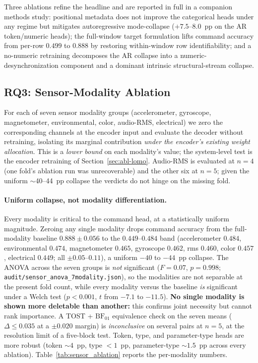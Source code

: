 \documentclass[sensors,article,submit,moreauthors,pdftex]{Definitions/mdpi}
\begin{document}
Three ablations refine the headline and are reported in full in a companion methods study: positional metadata does not improve the categorical heads under any regime but mitigates autoregressive mode-collapse ($+7.5$--$8.0$~pp on the AR token/numeric heads); the full-window target formulation lifts command accuracy from per-row $0.499$ to $0.888$ by restoring within-window row identifiability; and a no-numeric retraining decomposes the AR collapse into a numeric-desynchronization component and a dominant intrinsic structural-stream collapse.


\subsection{RQ3: Sensor-Modality Ablation}
\label{sec:abl-sensors}

For each of seven sensor modality groups (accelerometer, gyroscope, magnetometer, environmental, color, audio-RMS, electrical) we zero the corresponding channels at the encoder input and evaluate the decoder without retraining, isolating its marginal contribution \emph{under the encoder's existing weight allocation}. This is a \emph{lower bound} on each modality's value; the system-level test is the encoder retraining of Section~\ref{sec:abl-lomo}. Audio-RMS is evaluated at $n=4$ (one fold's ablation run was unrecoverable) and the other six at $n=5$; given the uniform $\sim$40--44~pp collapse the verdicts do not hinge on the missing fold.

\paragraph{Uniform collapse, not modality differentiation.} Every modality is critical to the command head, at a statistically uniform magnitude. Zeroing any single modality drops command accuracy from the full-modality baseline $0.888 \pm 0.056$ to the $0.449$--$0.484$ band (accelerometer $0.484$, environmental $0.474$, magnetometer $0.465$, gyroscope $0.462$, rms $0.460$, color $0.457$, electrical $0.449$; all $\pm 0.05$--$0.11$), a uniform $-40$ to $-44$~pp collapse. The ANOVA across the seven groups is \emph{not} significant ($F=0.07$, $p=0.998$; \texttt{audit/sensor\_anova\_7modality.json}), so the modalities are not separable at the present fold count, while every modality versus the baseline \emph{is} significant under a Welch test ($p<0.001$, $t$ from $-7.1$ to $-11.5$). \textbf{No single modality is shown more deletable than another:} this confirms joint necessity but cannot rank importance. A TOST + $\mathrm{BF}_{01}$ equivalence check on the seven means ($\Delta\!\le\!0.035$ at a $\pm 0.020$ margin) is \emph{inconclusive} on several pairs at $n\!=\!5$, at the resolution limit of a five-block test. Token, type, and parameter-type heads are more robust (token $\sim 4$~pp, type $<1$~pp, parameter-type $\sim 1.5$~pp across every ablation). Table~\ref{tab:sensor_ablation} reports the per-modality numbers.
\end{document}
